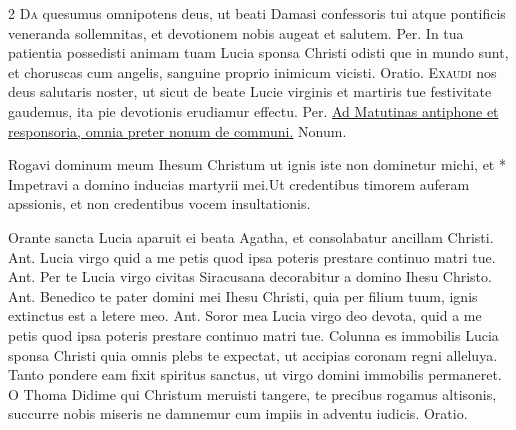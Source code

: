 \begin{multicols*}{2}
{\color{Red} }
\lettrine[lines=2]{\zallmancaps \color{Blue} D}{a} quesumus omnipotens deus, ut beati Damasi confessoris tui atque pontificis veneranda sollemnitas, et devotionem nobis augeat et salutem. Per.
{\color{Red} }
 In tua patientia possedisti animam tuam Lucia sponsa Christi odisti que in mundo sunt, et choruscas cum angelis, sanguine proprio inimicum vicisti. {\color{Red} Oratio.}
\lettrine[lines=2]{\zallmancaps \color{Red} E}{xaudi} nos deus salutaris noster, ut sicut de beate Lucie virginis et martiris tue festivitate gaudemus, ita pie devotionis erudiamur effectu. Per.
\newline \ul{Ad Matutinas antiphone et responsoria, omnia preter nonum de communi.} {\color{Red} Nonum.}%
\begin{responsory-doxology}
{Rogavi dominum meum Ihesum Christum ut ignis iste non dominetur michi, et * Impetravi a domino inducias martyrii mei.}{Ut credentibus timorem auferam apssionis, et non credentibus vocem insultationis.}
\end{responsory-doxology}%
 Orante sancta Lucia aparuit ei beata Agatha, et consolabatur ancillam Christi. {\color{Red} Ant.} Lucia virgo quid a me petis quod ipsa poteris prestare continuo matri tue. {\color{Red} Ant.} Per te Lucia virgo civitas Siracusana decorabitur a domino Ihesu Christo. {\color{Red} Ant.} Benedico te pater domini mei Ihesu Christi, quia per filium tuum, ignis extinctus est a letere meo. {\color{Red} Ant.} Soror mea Lucia virgo deo devota, quid a me petis quod ipsa poteris prestare continuo matri tue.
 Colunna es immobilis Lucia sponsa Christi quia omnis plebs te expectat, ut accipias coronam regni alleluya.
 Tanto pondere eam fixit spiritus sanctus, ut virgo domini immobilis permaneret.
{\color{Red} }
 O Thoma Didime qui Christum meruisti tangere, te precibus rogamus altisonis, succurre nobis miseris ne damnemur cum impiis in adventu iudicis. {\color{Red} Oratio.}

\end{multicols*}
